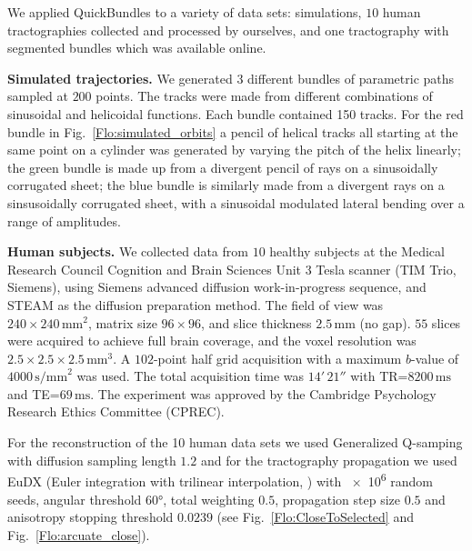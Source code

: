 \documentclass[preprint,authoryear,a4paper,10pt,onecolumn]{elsarticle}
\begin{document}
We applied QuickBundles to a variety of data sets: simulations, $10$ human
tractographies collected and processed by ourselves, and one tractography
with segmented bundles which was available online.

\textbf{Simulated trajectories.} We generated $3$ different bundles of
parametric paths sampled at $200$ points. The tracks were made from
different combinations of sinusoidal and helicoidal functions.  Each
bundle contained 150 tracks.  For the red bundle in
Fig.~\ref{Flo:simulated_orbits} a pencil of helical tracks all starting
at the same point on a cylinder was generated by varying the pitch of
the helix linearly; the green bundle is made up from a divergent pencil
of rays on a sinusoidally corrugated sheet; the blue bundle is similarly
made from a divergent rays on a sinsusoidally corrugated sheet, with a
sinusoidal modulated lateral bending over a range of amplitudes.


\textbf{Human subjects.} We collected data from $10$ healthy subjects at
the Medical Research Council Cognition and Brain Sciences Unit 3 Tesla scanner
(TIM Trio, Siemens), using Siemens advanced diffusion work-in-progress sequence,
and STEAM \citep{merboldt1992diffusion,MAB04} as the diffusion preparation
method. The field of view was $240\times240\,\textrm{mm}^{2}$, matrix size
$96\times96$, and slice thickness $2.5\,\textrm{mm}$ (no gap).  $55$ slices were
acquired to achieve full brain coverage, and the voxel resolution was
$2.5\times2.5\times2.5\,\textrm{mm}^{3}$. A $102$-point half grid acquisition
\citep{Yeh2010} with a maximum $b$-value of $4000\, \textrm{s/mm}^{2}$ was used.
The total acquisition time was $14'\,21''$ with TR=$8200\,\textrm{ms}$ and
TE=$69\,\textrm{ms}$. The experiment was approved by the Cambridge Psychology
Research Ethics Committee (CPREC).

For the reconstruction of the 10 human data sets we used Generalized
Q-samping \citep{Yeh2010} with diffusion sampling length $1.2$ and for
the tractography propagation we used EuDX (Euler integration with
trilinear interpolation, \citet{Garyfallidis_thesis}) with \num{e6}
random seeds, angular threshold \ang{60}, total weighting $0.5$,
propagation step size $0.5$ and anisotropy stopping threshold $0.0239$
(see Fig.~\ref{Flo:CloseToSelected} and Fig.~\ref{Flo:arcuate_close}).
\end{document}

